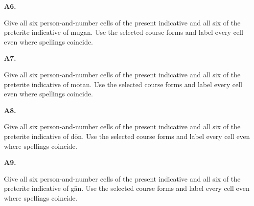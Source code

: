 \par\begin{minipage}{\linewidth}\raggedright
\textbf{A6.}

Give all six person-and-number cells of the present indicative and all six of the preterite indicative of mugan. Use the selected course forms and label every cell even where spellings coincide.

\end{minipage}\par\addvspace{4pt}

\par\begin{minipage}{\linewidth}\raggedright
\textbf{A7.}

Give all six person-and-number cells of the present indicative and all six of the preterite indicative of mōtan. Use the selected course forms and label every cell even where spellings coincide.

\end{minipage}\par\addvspace{4pt}

\par\begin{minipage}{\linewidth}\raggedright
\textbf{A8.}

Give all six person-and-number cells of the present indicative and all six of the preterite indicative of dōn. Use the selected course forms and label every cell even where spellings coincide.

\end{minipage}\par\addvspace{4pt}

\par\begin{minipage}{\linewidth}\raggedright
\textbf{A9.}

Give all six person-and-number cells of the present indicative and all six of the preterite indicative of gān. Use the selected course forms and label every cell even where spellings coincide.

\end{minipage}\par\addvspace{4pt}

